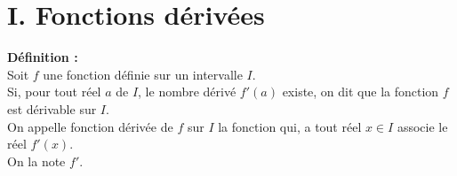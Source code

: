 \documentclass[11pt,a4paper]{article}
\title{\titre}
\author{\classe \\ \theme}
\date{}
\begin{document}
\maketitle
\pagestyle{custom}
\thispagestyle{custom}

\section*{I. Fonctions dérivées}
\begin{mdframed}[style=definitionStyle]
    \textbf{Définition :} ~\\
    Soit $f$ une fonction définie sur un intervalle $I$. \\
    Si, pour tout réel $a$ de $I$, le nombre dérivé $f'(a)$ existe, on dit que la fonction $f$ est dérivable sur $I$. \\
    On appelle fonction dérivée de $f$ sur $I$ la fonction qui, a tout réel $x\in I$ associe le réel $f'(x)$. \\
    On la note $f'$.
\end{mdframed}
\end{document}
